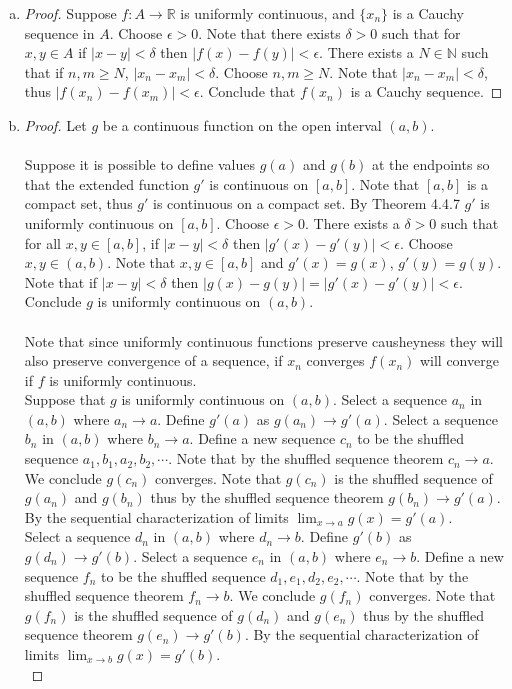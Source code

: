 \documentclass[12pt]{article}
\theoremstyle{homework}
\begin{document}
\begin{enumerate}[(a)]
\item
\begin{proof}
Suppose $f:A\rightarrow \mathbb{R}$ is uniformly continuous, and $\{x_n\}$ is a Cauchy sequence in $A$.  Choose $\epsilon>0$.  Note that there exists $\delta>0$ such that for $x,y\in A$ if $|x-y|<\delta$ then $|f(x)-f(y)|<\epsilon$.  There exists a $N\in\mathbb{N}$ such that if $n,m\geq N$, $|x_n-x_m|<\delta$.  Choose $n,m\geq N$.  Note that $|x_n-x_m|<\delta$, thus $|f(x_n)-f(x_m)|<\epsilon$.  Conclude that $f(x_n)$ is a Cauchy sequence.
\end{proof}
\item
\begin{proof}
Let $g$ be a continuous function on the open interval $(a, b)$.\\\\
Suppose it is possible to define values $g(a)$ and $g(b)$ at the endpoints so that the extended function $g'$ is continuous on $[a, b]$.  Note that $[a, b]$ is a compact set, thus $g'$ is continuous on a compact set.  By Theorem 4.4.7 $g'$ is uniformly continuous on $[a,b]$.  Choose $\epsilon>0$.  There exists a $\delta>0$ such that for all $x,y\in [a,b]$, if $|x-y|<\delta$ then $|g'(x)-g'(y)|<\epsilon$.  Choose $x,y\in (a,b)$.  Note that $x,y\in [a,b]$ and $g'(x)=g(x)$, $g'(y)=g(y)$.  Note that if $|x-y|<\delta$ then $|g(x)-g(y)|=|g'(x)-g'(y)|<\epsilon$.  Conclude $g$ is uniformly continuous on $(a,b)$.\\\\
Note that since uniformly continuous functions preserve causheyness they will also preserve convergence of a sequence, if $x_n$ converges $f(x_n)$ will converge if $f$ is uniformly continuous.\\
Suppose that $g$ is uniformly continuous on $(a,b)$.  Select a sequence $a_n$ in $(a,b)$ where $a_n\rightarrow a$.  Define $g'(a)$ as $g(a_n)\rightarrow g'(a)$.  Select a sequence $b_n$ in $(a,b)$ where $b_n\rightarrow a$.  Define a new sequence $c_n$ to be the shuffled sequence $a_1,b_1,a_2,b_2,\cdots$.  Note that by the shuffled sequence theorem $c_n\rightarrow a$.  We conclude $g(c_n)$ converges.  Note that $g(c_n)$ is the shuffled sequence of $g(a_n)$ and $g(b_n)$ thus by the shuffled sequence theorem $g(b_n)\rightarrow g'(a)$.  By the sequential characterization of limits $\lim_{x\rightarrow a}g(x)=g'(a)$.\\
Select a sequence $d_n$ in $(a,b)$ where $d_n\rightarrow b$.  Define $g'(b)$ as $g(d_n)\rightarrow g'(b)$.  Select a sequence $e_n$ in $(a,b)$ where $e_n\rightarrow b$.  Define a new sequence $f_n$ to be the shuffled sequence $d_1,e_1,d_2,e_2,\cdots$.  Note that by the shuffled sequence theorem $f_n\rightarrow b$.  We conclude $g(f_n)$ converges.  Note that $g(f_n)$ is the shuffled sequence of $g(d_n)$ and $g(e_n)$ thus by the shuffled sequence theorem $g(e_n)\rightarrow g'(b)$.  By the sequential characterization of limits $\lim_{x\rightarrow b}g(x)=g'(b)$.\\

\end{proof}
\end{enumerate}
\end{document}
